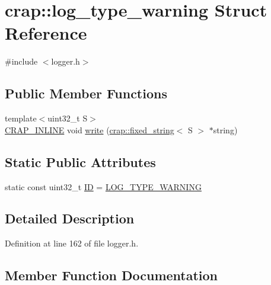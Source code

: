 \hypertarget{structcrap_1_1log__type__warning}{}\section{crap\+:\+:log\+\_\+type\+\_\+warning Struct Reference}
\label{structcrap_1_1log__type__warning}


{\ttfamily \#include $<$logger.\+h$>$}

\subsection*{Public Member Functions}
\begin{DoxyCompactItemize}
\item 
{\footnotesize template$<$uint32\+\_\+t S$>$ }\\\hyperlink{config__x86_8h_a5a40526b8d842e7ff731509998bb0f1c}{C\+R\+A\+P\+\_\+\+I\+N\+L\+I\+N\+E} void \hyperlink{structcrap_1_1log__type__warning_a1b523db5b36965a4834d94290edcdd78}{write} (\hyperlink{classcrap_1_1fixed__string}{crap\+::fixed\+\_\+string}$<$ S $>$ $\ast$string)
\end{DoxyCompactItemize}
\subsection*{Static Public Attributes}
\begin{DoxyCompactItemize}
\item 
static const uint32\+\_\+t \hyperlink{structcrap_1_1log__type__warning_ac810aca14e350fa909e401239bd9e829}{I\+D} = \hyperlink{logger_8h_a5781a92890ba75559c17d6c7f613ab29}{L\+O\+G\+\_\+\+T\+Y\+P\+E\+\_\+\+W\+A\+R\+N\+I\+N\+G}
\end{DoxyCompactItemize}


\subsection{Detailed Description}


Definition at line 162 of file logger.\+h.



\subsection{Member Function Documentation}
\hypertarget{structcrap_1_1log__type__warning_a1b523db5b36965a4834d94290edcdd78}{}
